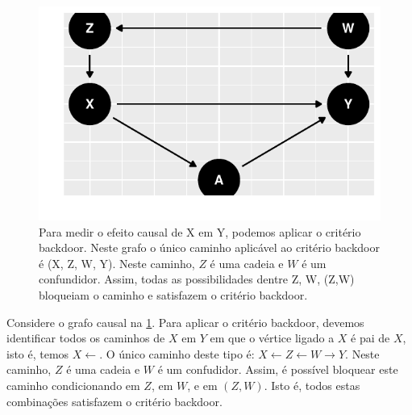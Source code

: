 \begin{example}
\begin{knitrout}
\color{fgcolor}\begin{figure}[t]

{\centering \includegraphics[width=\maxwidth]{./figures/backdoor_ex_1-1} 

}

\caption[Para medir o efeito causal de X em Y, podemos aplicar o critério backdoor]{Para medir o efeito causal de X em Y, podemos aplicar o critério backdoor. Neste grafo o único caminho aplicável ao critério backdoor é (X, Z, W, Y). Neste caminho, $Z$ é uma cadeia e $W$ é um confundidor. Assim, todas as possibilidades dentre Z, W, (Z,W) bloqueiam o caminho e satisfazem o critério backdoor.}\label{fig:backdoor_ex_1}
\end{figure}

\end{knitrout}

 Considere o grafo causal na \cref{fig:backdoor_ex_1}.
 Para aplicar o critério backdoor, devemos identificar
 todos os caminhos de $X$ em $Y$ em que
 o vértice ligado a $X$ é pai de $X$, isto é,
 temos $X \leftarrow$. O único caminho deste tipo é:
 $X \leftarrow Z \leftarrow W \rightarrow Y$.
 Neste caminho, $Z$ é uma cadeia e $W$ é um confudidor.
 Assim, é possível bloquear este caminho condicionando
 em $Z$, em $W$, e em $(Z,W)$.
 Isto é, todos estas combinações 
 satisfazem o critério backdoor.
\end{example}

